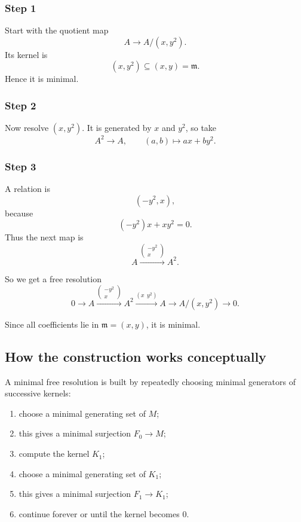 \documentclass[12pt,a4paper]{article}
\theoremstyle{notespace}
\newcommand{\m}{\mathfrak m}
\begin{document}
\subsubsection*{Step 1}
Start with the quotient map
\[
A\to A/(x,y^2).
\]
Its kernel is
\[
(x,y^2)\subseteq (x,y)=\m.
\]
Hence it is minimal.

\subsubsection*{Step 2}
Now resolve \((x,y^2)\). It is generated by \(x\) and \(y^2\), so take
\[
A^2\to A,\qquad (a,b)\mapsto ax+by^2.
\]

\subsubsection*{Step 3}
A relation is
\[
(-y^2,x),
\]
because
\[
(-y^2)x + xy^2 = 0.
\]
Thus the next map is
\[
A\xrightarrow{\begin{pmatrix}-y^2\\x\end{pmatrix}}A^2.
\]

So we get a free resolution
\[
0\longrightarrow A \xrightarrow{\begin{pmatrix}-y^2\\x\end{pmatrix}} A^2 \xrightarrow{(x\ \ y^2)} A \longrightarrow A/(x,y^2)\longrightarrow 0.
\]

Since all coefficients lie in \(\m=(x,y)\), it is minimal.

\subsection{How the construction works conceptually}

A minimal free resolution is built by repeatedly choosing minimal generators of successive kernels:

\begin{enumerate}[leftmargin=2em]
	\item choose a minimal generating set of \(M\);
	\item this gives a minimal surjection \(F_0\to M\);
	\item compute the kernel \(K_1\);
	\item choose a minimal generating set of \(K_1\);
	\item this gives a minimal surjection \(F_1\to K_1\);
	\item continue forever or until the kernel becomes \(0\).
\end{enumerate}
\end{document}
